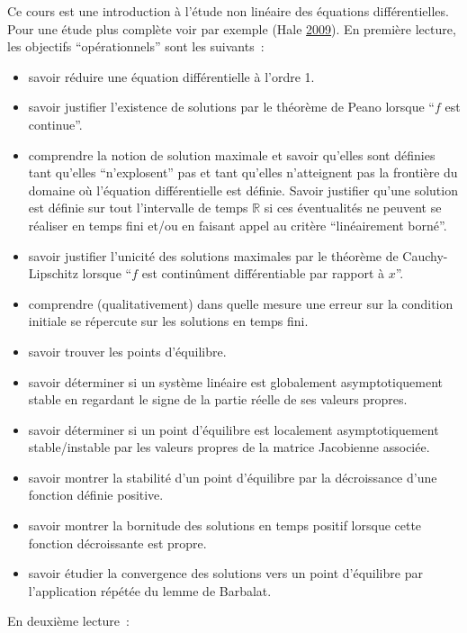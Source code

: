Ce cours est une introduction à l'étude non linéaire des équations
différentielles. Pour une étude plus complète voir par exemple (Hale
\protect\hyperlink{ref-Hale}{2009}). En première lecture, les objectifs
``opérationnels'' sont les suivants~:

\begin{itemize}
\item
  savoir réduire une équation différentielle à l'ordre 1.
\item
  savoir justifier l'existence de solutions par le théorème de Peano
  lorsque ``\(f\) est continue''.
\item
  comprendre la notion de solution maximale et savoir qu'elles sont
  définies tant qu'elles ``n'explosent'' pas et tant qu'elles
  n'atteignent pas la frontière du domaine où l'équation différentielle
  est définie. Savoir justifier qu'une solution est définie sur tout
  l'intervalle de temps \(\mathbb{R}\) si ces éventualités ne peuvent se
  réaliser en temps fini et/ou en faisant appel au critère
  ``linéairement borné''.
\item
  savoir justifier l'unicité des solutions maximales par le théorème de
  Cauchy-Lipschitz lorsque ``\(f\) est continûment différentiable par
  rapport à \(x\)''.
\item
  comprendre (qualitativement) dans quelle mesure une erreur sur la
  condition initiale se répercute sur les solutions en temps fini.
\item
  savoir trouver les points d'équilibre.
\item
  savoir déterminer si un système linéaire est globalement
  asymptotiquement stable en regardant le signe de la partie réelle de
  ses valeurs propres.
\item
  savoir déterminer si un point d'équilibre est localement
  asymptotiquement stable/instable par les valeurs propres de la matrice
  Jacobienne associée.
\item
  savoir montrer la stabilité d'un point d'équilibre par la décroissance
  d'une fonction définie positive.
\item
  savoir montrer la bornitude des solutions en temps positif lorsque
  cette fonction décroissante est propre.
\item
  savoir étudier la convergence des solutions vers un point d'équilibre
  par l'application répétée du lemme de Barbalat.
\end{itemize}

En deuxième lecture~:

